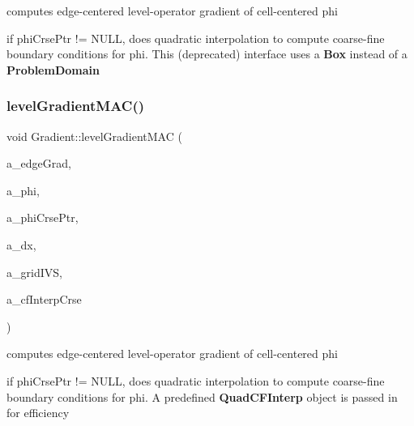 computes edge-\/centered level-\/operator gradient of cell-\/centered phi 

if phi\+Crse\+Ptr != N\+U\+LL, does quadratic interpolation to compute coarse-\/fine boundary conditions for phi. This (deprecated) interface uses a \textbf{ Box} instead of a \textbf{ Problem\+Domain} \mbox{\label{class_gradient_a1e5777612a7ff994896d694e2c1c816b}} 
\subsubsection{\texorpdfstring{level\+Gradient\+M\+A\+C()}{levelGradientMAC()}\hspace{0.1cm}{\footnotesize\ttfamily [3/4]}}
{\footnotesize\ttfamily void Gradient\+::level\+Gradient\+M\+AC (\begin{DoxyParamCaption}\item[{\textbf{ Level\+Data}$<$ \textbf{ Flux\+Box} $>$ \&}]{a\+\_\+edge\+Grad,  }\item[{\textbf{ Level\+Data}$<$ \textbf{ F\+Array\+Box} $>$ \&}]{a\+\_\+phi,  }\item[{const \textbf{ Level\+Data}$<$ \textbf{ F\+Array\+Box} $>$ $\ast$}]{a\+\_\+phi\+Crse\+Ptr,  }\item[{const \textbf{ Real}}]{a\+\_\+dx,  }\item[{const \textbf{ Layout\+Data}$<$ \textbf{ Int\+Vect\+Set} $>$ \&}]{a\+\_\+grid\+I\+VS,  }\item[{\textbf{ Quad\+C\+F\+Interp} \&}]{a\+\_\+cf\+Interp\+Crse }\end{DoxyParamCaption})\hspace{0.3cm}{\ttfamily [static]}}



computes edge-\/centered level-\/operator gradient of cell-\/centered phi 

if phi\+Crse\+Ptr != N\+U\+LL, does quadratic interpolation to compute coarse-\/fine boundary conditions for phi. A predefined \textbf{ Quad\+C\+F\+Interp} object is passed in for efficiency \mbox{\label{class_gradient_a3d95193c15462219bd5159de5341b291}} 
